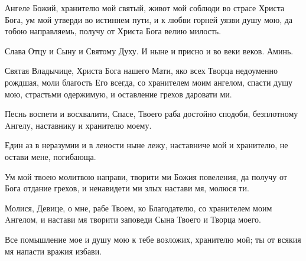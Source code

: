 \mychapterending


\begin{mymulticols}



Ангеле Божий, хранителю мой святый, живот мой соблюди во страсе Христа Бога, ум мой утверди во истиннем пути, и к любви горней уязви душу мою, да тобою направляемь, получу от Христа Бога велию милость.

Слава Отцу и Сыну и Святому Духу. И ныне и присно и во веки веков. Аминь.


Святая Владычице, Христа Бога нашего Мати, яко всех Творца недоуменно рождшая, моли благость Его всегда, со хранителем моим ангелом, спасти душу мою, страстьми одержимую, и оставление грехов даровати ми.





Песнь воспети и восхвалити, Спасе, Твоего раба достойно сподоби, безплотному Aнгелу, наставнику и хранителю моему.


Един аз в неразумии и в лености ныне лежу, наставниче мой и хранителю, не остави мене, погибающа.

\slava

Ум мой твоею молитвою направи, творити ми Божия повеления, да получу от Бога отдание грехов, и ненавидети ми злых настави мя, молюся ти.

\inyne

Молися, Девице, о мне, рабе Твоем, ко Благодателю, со хранителем моим Aнгелом, и настави мя творити заповеди Сына Твоего и Творца моего.




Все помышление мое и душу мою к тебе возложих, хранителю мой; ты от всякия мя напасти вражия избави.


\end{mymulticols}
